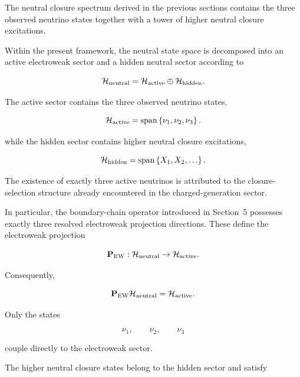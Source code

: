 \documentclass[11pt]{article}
\theoremstyle{definition}
\theoremstyle{remark}
\begin{document}
The neutral closure spectrum derived in the previous sections
contains the three observed neutrino states together with a
tower of higher neutral closure excitations.

Within the present framework, the neutral state space is
decomposed into an active electroweak sector and a hidden
neutral sector according to

\begin{equation}
\mathcal H_{\rm neutral} = \mathcal H_{\rm active}
\oplus
\mathcal H_{\rm hidden}.
\label{eq:Hneutral_decomposition}
\end{equation}

The active sector contains the three observed neutrino states,

\begin{equation}
\mathcal H_{\rm active}
=
\operatorname{span}
\left\{
\nu_1,
\nu_2,
\nu_3
\right\}.
\label{eq:Hactive}
\end{equation}

while the hidden sector contains higher neutral closure
excitations,

\begin{equation}
\mathcal H_{\rm hidden}
=
\operatorname{span}
\left\{
X_1,
X_2,
\ldots
\right\}.
\label{eq:Hhidden}
\end{equation}

The existence of exactly three active neutrinos is attributed
to the closure-selection structure already encountered in the
charged-generation sector.

In particular, the boundary-chain operator introduced in
Section~5 possesses exactly three resolved electroweak
projection directions. These define the electroweak projection

\begin{equation}
\mathbf P_{\rm EW}
:
\mathcal H_{\rm neutral}
\rightarrow
\mathcal H_{\rm active}.
\label{eq:PEW_definition}
\end{equation}

Consequently,

\begin{equation}
\mathbf P_{\rm EW}
\mathcal H_{\rm neutral}
=
\mathcal H_{\rm active}.
\label{eq:PEW_active}
\end{equation}

Only the states

\[
\nu_1,
\qquad
\nu_2,
\qquad
\nu_3
\]

couple directly to the electroweak sector.

The higher neutral closure states belong to the hidden sector
and satisfy
\end{document}
